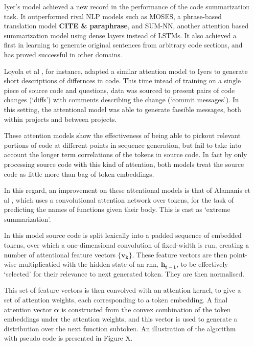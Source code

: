 Iyer's model achieved a new record in the performance of the code summarization task. 
It outperformed rival NLP models such as MOSES, a phrase-based translation model \textbf{CITE \& paraphrase}, and SUM-NN, another attention based summarization model using dense layers instead of LSTMs. 
It also achieved a first in learning to generate original sentences from arbitrary code sections, and has proved successful in other domains.  

Loyola et al \cite{loyola_neural_2017}, for instance, adapted a similar attention model to Iyers to generate short descriptions of differnces in code.
This time intead of training on a single piece of source code and questions, data was sourced to present pairs of code changes (`diffs') with comments describing the change (`commit messages'). 
In this setting, the attentional model was able to generate faesible messages, both within projects and between projects.

These attention models show the effectiveness of being able to pickout relevant portions of code at different points in sequence generation, but fail to take into account the longer term correlations of the tokens in source code. In fact by only processing source code with this kind of attention, both models treat the source code as little more than bag of token embeddings.

In this regard, an improvement on these attentional models is that of Alamanis et al \cite{allamanis_convolutional_2016}, which uses a convolutional attention network over tokens, for the task of predicting the names of functions given their body. This is cast as `extreme summarization'.

In this model source code is split lexically into a padded sequence of embedded tokens, over which a one-dimensional convolution of fixed-width is run, creating a number of attentional feature vectors $\mathbf{\{v_k\}}$.
These feature vectors are then point-wise multiplicatied with the hidden state of an rnn, $\mathbf{h_{t-1}}$, to be effectively `selected' for their relevance to next generated token. They are then normalised.

This set of feature vectors is then convolved with an attention kernel, to give a set of attention weights, each corresponding to a token embedding. 
A final attention vector $\mathbf{\alpha}$ is constructed from the convex combination of the token embeddings under the attention weights, and this vector is used to generate a distribution over the next function subtoken.
An illustration of the algorithm with pseudo code is presented in Figure X.

